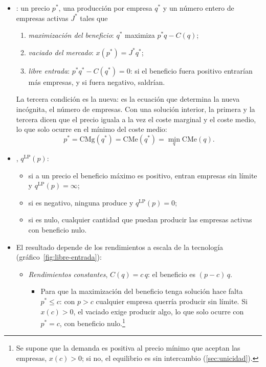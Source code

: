 \documentclass[11pt]{article}
\begin{document}
\begin{itemize}
\item {}\nocite{MasColellWhinstonGreen1995}: un precio $p^*$, una producción por empresa $q^*$ y un número entero de empresas activas $J^*$ tales que
  \begin{enumerate}
  \item \emph{maximización del beneficio}: $q^*$ maximiza $p^*q-C(q)$;
  \item \emph{vaciado del mercado}: $x(p^*)=J^*q^*$;
  \item \emph{libre entrada}: $p^*q^*-C(q^*)=0$: si el beneficio fuera positivo entrarían más empresas, y si fuera negativo, saldrían.
  \end{enumerate}
  La tercera condición es la nueva: es la ecuación que determina la nueva incógnita, el número de empresas. Con una solución interior, la primera y la tercera dicen que el precio iguala a la vez el coste marginal y el coste medio, lo que solo ocurre en el mínimo del coste medio:
  \begin{equation}
  p^*=\mathrm{CMg}(q^*)=\mathrm{CMe}(q^*)=\min_q\mathrm{CMe}(q). \label{eq:equilibrio-lp}
  \end{equation}
\item {}, $q^{\mathrm{LP}}(p)$:
  \begin{itemize}
  \item si a un precio el beneficio máximo es positivo, entran empresas sin límite y $q^{\mathrm{LP}}(p)=\infty$;
  \item si es negativo, ninguna produce y $q^{\mathrm{LP}}(p)=0$;
  \item si es nulo, cualquier cantidad que puedan producir las empresas activas con beneficio nulo.
  \end{itemize}
\item El resultado depende de los rendimientos a escala de la tecnología (gráfico~\ref{fig:libre-entrada}):
  \begin{itemize}
  \item \emph{Rendimientos constantes}, $C(q)=c\,q$: el beneficio es $(p-c)\,q$.
    \begin{itemize}
    \item Para que la maximización del beneficio tenga solución hace falta $p^*\leq c$: con $p>c$ cualquier empresa querría producir sin límite. Si $x(c)>0$, el vaciado exige producir algo, lo que solo ocurre con $p^*=c$, con beneficio nulo.\footnote{Se supone que la demanda es positiva al precio mínimo que aceptan las empresas, $x(c)>0$; si no, el equilibrio es sin intercambio (\ref{sec:unicidad}).}

\end{itemize}
\end{itemize}
\end{itemize}
\end{document}
